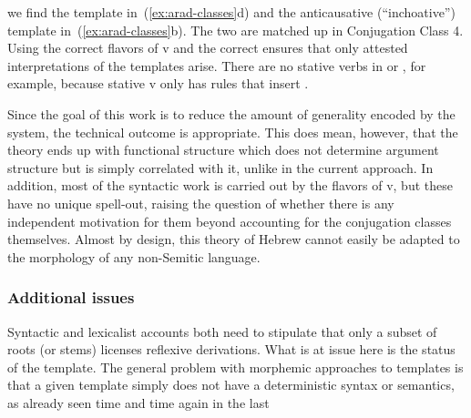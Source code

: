 \begin{exe}
\begin{xlist}
\begin{xlist}
\begin{exe}
\begin{xlist}
\begin{xlist}
\begin{exe}
\begin{xlist}
\begin{xlist}
\begin{exe}
\begin{exe}
\begin{xlist}
\begin{exe}
\begin{exe}
\begin{xlist}
\begin{exe}
\begin{exe}
\begin{exe}
\begin{exe}
\begin{exe}
\begin{xlist}
\begin{exe}
\begin{xlist}
\begin{exe}
\begin{exe}
\begin{xlist}
\begin{exe}
\begin{xlist}
\begin{exe}
\begin{exe}
\begin{exe}
\begin{xlist}
\begin{exe}
\begin{exe}
\begin{exe}
\begin{xlist}
\begin{exe}
\begin{xlist}
\begin{exe}
\begin{xlist}
\begin{exe}
\begin{xlist}
\begin{exe}
\begin{exe}
\begin{exe}
\begin{exe}
\begin{xlist}
\begin{exe}
\begin{xlist}
\begin{exe}
\begin{xlist}
\begin{exe}
\begin{xlist}
\begin{exe}
\begin{xlist}
\begin{exe}
\begin{xlist}
\begin{exe}
\begin{exe}
\begin{exe}
\begin{exe}
\begin{xlist}
\begin{exe}
\begin{xlist}
\begin{exe}
\begin{xlist}
\begin{exe}
\begin{exe}
\begin{xlist}
\begin{exe}
\begin{exe}
\begin{exe}
\begin{exe}
\begin{xlist}
\begin{xlist}
\begin{exe}
\begin{xlist}
\begin{exe}
\begin{exe}
\begin{exe}
\begin{xlist}
\begin{exe}
\begin{exe}
\begin{xlist}
\begin{exe}
\begin{exe}
\begin{exe}
\begin{xlist}
\begin{xlist}
\begin{exe}
\begin{xlist}
\begin{exe}
\begin{exe}
\begin{exe}
\begin{exe}
\begin{xlist}
\begin{exe}
\begin{xlist}
\begin{exe}
\begin{xlist}
\begin{exe}
\begin{exe}
\begin{exe}
\begin{exe}
\begin{exe}
\begin{exe}
\begin{xlist}
\begin{exe}
\begin{xlist}
\begin{exe}
\begin{xlist}
\begin{exe}
\begin{xlist}
\begin{exe}
\begin{xlist}
\begin{exe}
\begin{xlist}
\begin{exe}
\begin{xlist}
we find the  template in~(\ref{ex:arad-classes}d) and the anticausative (``inchoative'') template in~(\ref{ex:arad-classes}b). The two are matched up in Conjugation Class 4. Using the correct flavors of v and the correct  ensures that only attested interpretations of the templates arise. There are no stative verbs in {\tpie} or {\thit}, for example, because stative v only has rules that insert {\tkal}. 

Since the goal of this work is to reduce the amount of generality encoded by the system, the technical outcome is appropriate. This does mean, however, that the theory ends up with functional structure which does not determine argument structure but is simply correlated with it, unlike in the current approach. In addition, most of the syntactic work is carried out by the flavors of v, but these have no unique spell-out, raising the question of whether there is any independent motivation for them beyond accounting for the conjugation classes themselves. Almost by design, this theory of Hebrew cannot easily be adapted to the morphology of any non-Semitic language.

		\subsubsection{Additional issues}
Syntactic and lexicalist accounts both need to stipulate that only a subset of roots (or stems) licenses reflexive derivations. What is at issue here is the status of the template. The general problem with morphemic approaches to templates is that a given template simply does not have a deterministic syntax or semantics, as already seen time and time again in the last 
\end{xlist}
\end{exe}
\end{xlist}
\end{exe}
\end{xlist}
\end{exe}
\end{xlist}
\end{exe}
\end{xlist}
\end{exe}
\end{xlist}
\end{exe}
\end{xlist}
\end{exe}
\end{exe}
\end{exe}
\end{exe}
\end{exe}
\end{exe}
\end{xlist}
\end{exe}
\end{xlist}
\end{exe}
\end{xlist}
\end{exe}
\end{exe}
\end{exe}
\end{exe}
\end{xlist}
\end{exe}
\end{xlist}
\end{xlist}
\end{exe}
\end{exe}
\end{exe}
\end{xlist}
\end{exe}
\end{exe}
\end{xlist}
\end{exe}
\end{exe}
\end{exe}
\end{xlist}
\end{exe}
\end{xlist}
\end{xlist}
\end{exe}
\end{exe}
\end{exe}
\end{exe}
\end{xlist}
\end{exe}
\end{exe}
\end{xlist}
\end{exe}
\end{xlist}
\end{exe}
\end{xlist}
\end{exe}
\end{exe}
\end{exe}
\end{exe}
\end{xlist}
\end{exe}
\end{xlist}
\end{exe}
\end{xlist}
\end{exe}
\end{xlist}
\end{exe}
\end{xlist}
\end{exe}
\end{xlist}
\end{exe}
\end{exe}
\end{exe}
\end{exe}
\end{xlist}
\end{exe}
\end{xlist}
\end{exe}
\end{xlist}
\end{exe}
\end{xlist}
\end{exe}
\end{exe}
\end{exe}
\end{xlist}
\end{exe}
\end{exe}
\end{exe}
\end{xlist}
\end{exe}
\end{xlist}
\end{exe}
\end{exe}
\end{xlist}
\end{exe}
\end{xlist}
\end{exe}
\end{exe}
\end{exe}
\end{exe}
\end{exe}
\end{xlist}
\end{exe}
\end{exe}
\end{xlist}
\end{exe}
\end{exe}
\end{xlist}
\end{xlist}
\end{exe}
\end{xlist}
\end{xlist}
\end{exe}
\end{xlist}
\end{xlist}
\end{exe}
